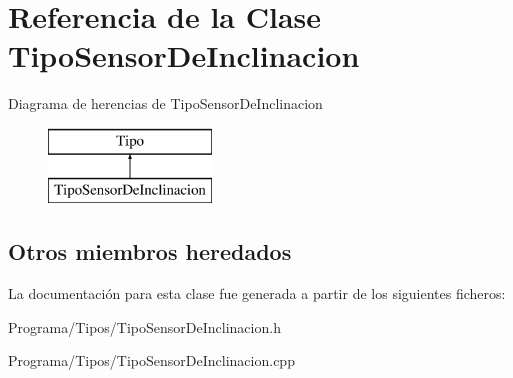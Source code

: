 \hypertarget{class_tipo_sensor_de_inclinacion}{\section{Referencia de la Clase Tipo\-Sensor\-De\-Inclinacion}
\label{class_tipo_sensor_de_inclinacion}
}
Diagrama de herencias de Tipo\-Sensor\-De\-Inclinacion\begin{figure}[H]
\begin{center}
\leavevmode
\includegraphics[height=2.000000cm]{class_tipo_sensor_de_inclinacion}
\end{center}
\end{figure}
\subsection*{Otros miembros heredados}


La documentación para esta clase fue generada a partir de los siguientes ficheros\-:\begin{DoxyCompactItemize}
\item 
Programa/\-Tipos/Tipo\-Sensor\-De\-Inclinacion.\-h\item 
Programa/\-Tipos/Tipo\-Sensor\-De\-Inclinacion.\-cpp\end{DoxyCompactItemize}
